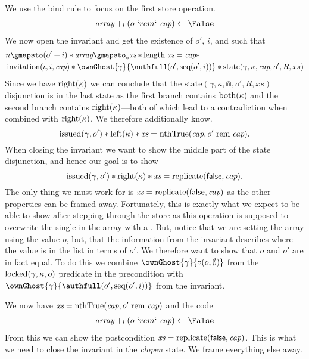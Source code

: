 We use the bind rule to focus on the first store operation.
\begin{align*}
  \Array \plusl (o\ `rem`\ \Cap) \gets \False
\end{align*}
We now open the invariant and get the existence of $o'$, $i$, and \xs such that
\begin{align*}
  & n \gmapsto (o' + i) \ast
    \Array \gmapsto_{*} \xs \ast \length\ \xs = \Cap \ast \\
  & \invitation(\iota, i, \Cap) \ast
    \ownGhost{\gamma}{\authfull ( o', \seq(o', i))} \ast
    \text{state}(\gamma, \kappa, \Cap, o', R, xs)
\end{align*}
Since we have $\text{right}(\kappa)$ we can conclude that the $\text{state}(\gamma, \kappa,
\Cap, o', R, xs)$ disjunction is in the last state as the first branch contains
$\text{both}(\kappa)$ and the second branch contains $\text{right}(\kappa)$---both of which lead to a
contradiction when combined with $\text{right}(\kappa)$. We therefore additionally know.
\[
  \text{issued}(\gamma, o') \ast \text{left}(\kappa) \ast \textit{xs} = \text{nthTrue}(\textit{cap}, o' \;\mathrm{rem}\; \textit{cap}).
\]
When closing the invariant we want to show the middle part of the state
disjunction, and hence our goal is to show
\[
  \text{issued}(\gamma, o') \ast \text{right}(\kappa) \ast \textit{xs} = \operatorname{replicate}(\textsf{false}, \textit{cap}).
\]
The only thing we must work for is $\textit{xs} = \operatorname{replicate}(\textsf{false}, \textit{cap})$ as the
other properties can be framed away. Fortunately, this is exactly what we
expect to be able to show after stepping through the store as this operation is
supposed to overwrite the single \True{} in the array with a \False. But, notice
that we are setting the array using the value $o$, but, that the information
from the invariant describes where the \True{} value is in the list in terms of
$o'$. We therefore want to show that $o$ and $o'$ are in fact equal. To do
this we combine $\ownGhost{\gamma}{\circ(o, \emptyset)}$ from the
$\operatorname{locked}(\gamma, \kappa, o)$ predicate in the precondition with 
$\ownGhost{\gamma}{\authfull ( o', \seq(o', i))}$ from the invariant.

We now have $ \textit{xs} = \text{nthTrue}(\textit{cap}, o' \;\mathrm{rem}\; \textit{cap})$ and the code
\begin{align*}
  \Array \plusl (o\ `rem`\ \Cap) \gets \False
\end{align*}
From this we can show the postcondition $\textit{xs} = \operatorname{replicate}(\textsf{false}, \textit{cap})$.
This is what we need to close the invariant in the \textit{clopen} state.
We frame everything else away.


